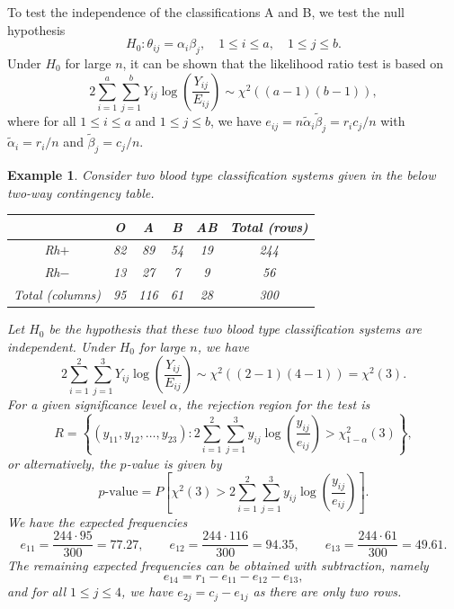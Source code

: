 \documentclass[10pt]{article}
\theoremstyle{newstyle}
\newtheorem{exmp}[thm]{Example}
\begin{document}
To test the independence of the classifications A and B, we test the null hypothesis 
\[ H_0 : \theta_{ij} = \alpha_i \beta_j, \quad 1 \leq i \leq a, \quad 1 \leq j \leq b. \]
Under $H_0$ for large $n$, it can be shown that the likelihood ratio test is based on 
\[ 2 \sum_{i=1}^a \sum_{j=1}^b Y_{ij} \log \left( \frac{Y_{ij}}{E_{ij}} \right) \sim \chi^2((a-1)(b-1)), \]
where for all $1 \leq i \leq a$ and $1 \leq j \leq b$, we have $e_{ij} = n\tilde\alpha_i \tilde\beta_j = r_i c_j/n$ with $\tilde\alpha_i = r_i/n$ and $\tilde\beta_j = c_j/n$. 

\begin{exmp}
Consider two blood type classification systems given in the below two-way contingency table. 
\begin{table}[H]
\centering
\begin{tabular}{|c|c|c|c|c|c|}
\hline
                & O  & A   & B  & AB & Total (rows) \\ \hline
Rh$+$             & 82 & 89  & 54 & 19 & 244          \\ \hline
Rh$-$             & 13 & 27  & 7  & 9  & 56           \\ \hline
Total (columns) & 95 & 116 & 61 & 28 & 300          \\ \hline
\end{tabular}
\end{table}
Let $H_0$ be the hypothesis that these two blood type classification systems are independent. Under 
$H_0$ for large $n$, we have 
\[ 2 \sum_{i=1}^2 \sum_{j=1}^3 Y_{ij} \log \left( \frac{Y_{ij}}{E_{ij}} \right) \sim 
\chi^2((2-1)(4-1)) = \chi^2(3). \]
For a given significance level $\alpha$, the rejection region for the test is 
\[ R = \left\{(y_{11}, y_{12}, \dots, y_{23}) : 2 \sum_{i=1}^2 \sum_{j=1}^3 y_{ij} \log \left( \frac{y_{ij}}{e_{ij}} \right) > \chi^2_{1-\alpha}(3) \right\}, \] 
or alternatively, the $p$-value is given by 
\[ \text{$p$-value} = P \left[ \chi^2(3) > 2 \sum_{i=1}^2 \sum_{j=1}^3 y_{ij} \log \left( \frac{y_{ij}}{e_{ij}} \right) \right]. \]
We have the expected frequencies 
\[ e_{11} = \frac{244 \cdot 95}{300} = 77.27, \quad\quad e_{12} = \frac{244 \cdot 116}{300} = 94.35, 
\quad\quad e_{13} = \frac{244 \cdot 61}{300} = 49.61. \]
The remaining expected frequencies can be obtained with subtraction, namely
\[ e_{14} = r_1 - e_{11} - e_{12} - e_{13}, \]
and for all $1 \leq j \leq 4$, we have 
$e_{2j} = c_j - e_{1j}$ as there are only two rows.
\begin{table}[H]
\centering
\begin{tabular}{|c|c|c|c|c|c|}

\end{tabular}
\end{table}
\end{exmp}
\end{document}
